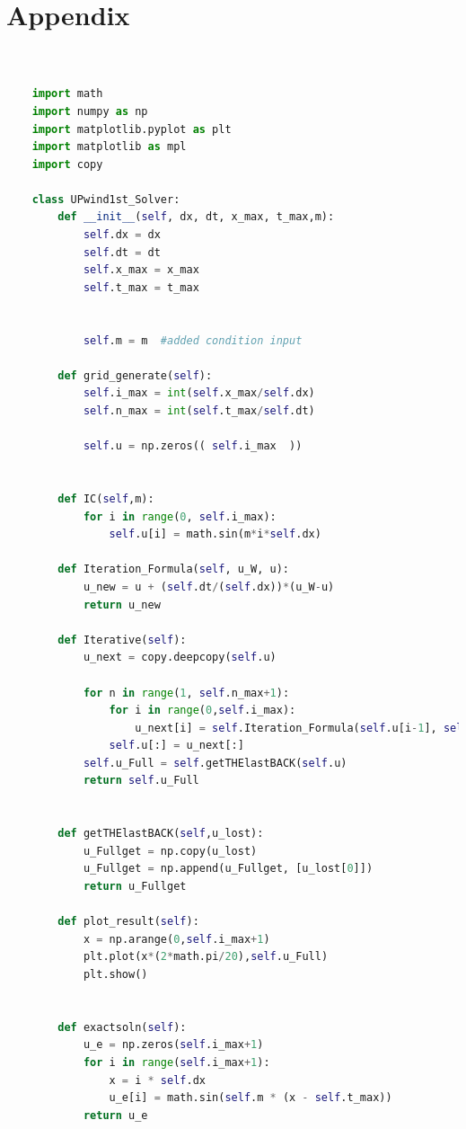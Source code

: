 \documentclass[12pt]{article}
\begin{document}
\section*{Appendix}
\begin{scriptsize}
\begin{lstlisting}[language=python,caption={Problem1, Py code for Solvers}]


    import math
    import numpy as np
    import matplotlib.pyplot as plt
    import matplotlib as mpl
    import copy
    
    class UPwind1st_Solver:
        def __init__(self, dx, dt, x_max, t_max,m):
            self.dx = dx
            self.dt = dt
            self.x_max = x_max
            self.t_max = t_max
    
    
            self.m = m  #added condition input
    
        def grid_generate(self):
            self.i_max = int(self.x_max/self.dx)
            self.n_max = int(self.t_max/self.dt)
    
            self.u = np.zeros(( self.i_max  ))
    
        
        def IC(self,m):
            for i in range(0, self.i_max):
                self.u[i] = math.sin(m*i*self.dx)
    
        def Iteration_Formula(self, u_W, u):
            u_new = u + (self.dt/(self.dx))*(u_W-u)
            return u_new
    
        def Iterative(self):
            u_next = copy.deepcopy(self.u)
    
            for n in range(1, self.n_max+1):
                for i in range(0,self.i_max):
                    u_next[i] = self.Iteration_Formula(self.u[i-1], self.u[i])
                self.u[:] = u_next[:]
            self.u_Full = self.getTHElastBACK(self.u)
            return self.u_Full
        
    
        def getTHElastBACK(self,u_lost):
            u_Fullget = np.copy(u_lost)
            u_Fullget = np.append(u_Fullget, [u_lost[0]])
            return u_Fullget
        
        def plot_result(self):
            x = np.arange(0,self.i_max+1)
            plt.plot(x*(2*math.pi/20),self.u_Full)
            plt.show()
    
        
        def exactsoln(self):
            u_e = np.zeros(self.i_max+1)
            for i in range(self.i_max+1):
                x = i * self.dx
                u_e[i] = math.sin(self.m * (x - self.t_max))
            return u_e
    

\end{lstlisting}
\end{scriptsize}
\end{document}
